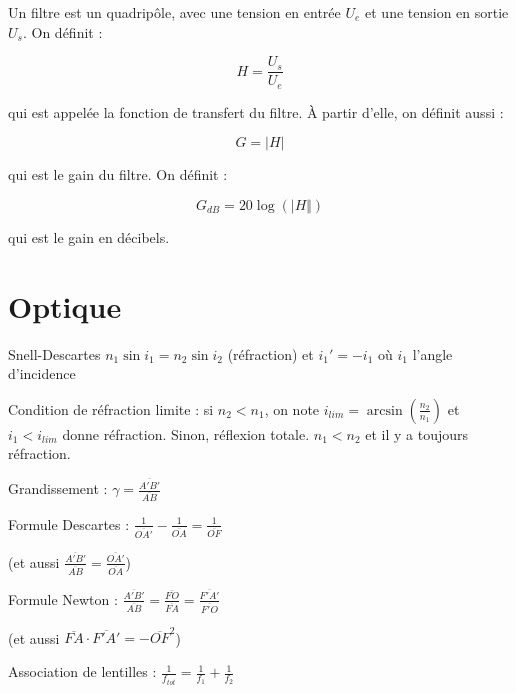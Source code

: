 \documentclass[a4paper,12pt]{book}
\newcommand{\Def}[2]{\begin{tcolorbox}[colback=white,colframe=red!10!green!20!blue!75!, title=Définition : #1]#2\end{tcolorbox}}
\newcommand{\Thr}[2]{\begin{tcolorbox}[sharp corners, colback=white,colframe=red!10!blue!30!green!75!, title=Théorème : #1]#2\end{tcolorbox}}
\begin{document}
\Def{Fonction de Transfert}{Un filtre est un quadripôle, avec une tension en entrée $U_e$ et une tension en sortie $U_s$. On définit :
\par $$H = \frac{U_s}{U_e}$$
\par qui est appelée la fonction de transfert du filtre. À partir d'elle, on définit aussi :
\par $$G = \vert H\vert$$
\par qui est le gain du filtre. On définit :
\par $$G_{dB} = 20\log(\vert H\Vert)$$
\par qui est le gain en décibels.}
\Def{Ordre des filtres}{}
\Thr{Calcul pratique d'argument}{}



\newpage
\section{Optique}
Snell-Descartes $n_1\sin i_1 = n_2\sin i_2$ (réfraction) et $i_1'=-i_1$ où $i_1$ l'angle d'incidence
\par Condition de réfraction limite : si $n_2<n_1$, on note $i_{lim} =\arcsin\left(\frac{n_2}{n_1}\right)$ et $i_1<i_{lim}$ donne réfraction. Sinon, réflexion totale. $n_1<n_2$ et il y a toujours réfraction.
\par Grandissement : $\gamma = \frac{\overline{A'B'}}{\overline{AB}}$
\par Formule Descartes : $\frac{1}{\overline{OA'}}-\frac{1}{\overline{OA}}=\frac{1}{\overline{OF}}$ 
\par (et aussi $\frac{\overline{A'B'}}{\overline{AB}}=\frac{\overline{OA'}}{\overline{OA}}$)
\par Formule Newton : $\frac{\overline{A'B'}}{\overline{AB}}=\frac{\overline{FO}}{\overline{FA}}=\frac{\overline{F'A'}}{\overline{F'O}}$
\par (et aussi $\overline{FA}\cdot\overline{F'A'}=-\overline{OF}^2$)
\par Association de lentilles : $\frac{1}{f_{tot}}=\frac{1}{f_1}+\frac{1}{f_2}$


\newpage
\end{document}
